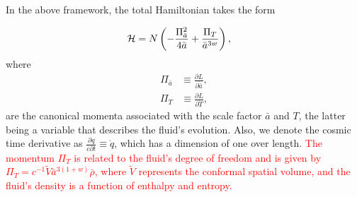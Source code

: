 \documentclass[a4paper,11pt]{article}
\newcommand{\dpar}[1]{\left(#1 \right)}
\begin{document}
In the above framework, the total Hamiltonian takes the form

\begin{align}
\label{total_hamiltonian_FLRW}
            {\cal H} & = N\dpar{- \frac{\Pi_{\bar{a}}^{2} }{ 4\bar{a} } + \frac{\Pi_{T}}{\bar{a}^{3w}} } ,
        \end{align}
        where 
        \begin{align}
            \Pi_{\bar{a}} & \equiv \frac{ \partial L}{\partial \dot{\bar{a}}}
            ,\end{align}
        \begin{align}
            \Pi_T & \equiv \frac{ \partial L}{ \partial \dot{T}} 
        ,\end{align}
        are the canonical momenta associated with the scale factor $\bar{a}$ and $T$, 
        the latter being a variable that describes the fluid's evolution. Also, we denote the cosmic time derivative as $\frac{\partial q}{c\partial t} \equiv \dot{q}$, which has a dimension of one over length.
        \textcolor{red}{The momentum $\Pi_T$ is related to the fluid's degree of freedom and is given by $\Pi_T = c^{-1} \tilde{V} \bar{a}^{3(1 + w)} \bar{\rho}$, where $\tilde{V}$ represents the conformal spatial volume, and the fluid's density is a function of enthalpy and entropy.} 
\end{document}
